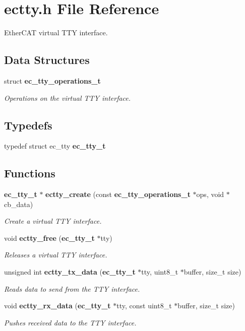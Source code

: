 \section{ectty.\-h \-File \-Reference}
\label{ectty_8h}


\-Ether\-C\-A\-T virtual \-T\-T\-Y interface.  


\subsection*{\-Data \-Structures}
\begin{DoxyCompactItemize}
\item 
struct {\bf ec\-\_\-tty\-\_\-operations\-\_\-t}
\begin{DoxyCompactList}\small\item\em \-Operations on the virtual \-T\-T\-Y interface. \end{DoxyCompactList}\end{DoxyCompactItemize}
\subsection*{\-Typedefs}
\begin{DoxyCompactItemize}
\item 
typedef struct ec\-\_\-tty {\bf ec\-\_\-tty\-\_\-t}
\end{DoxyCompactItemize}
\subsection*{\-Functions}
\begin{DoxyCompactItemize}
\item 
{\bf ec\-\_\-tty\-\_\-t} $\ast$ {\bf ectty\-\_\-create} (const {\bf ec\-\_\-tty\-\_\-operations\-\_\-t} $\ast$ops, void $\ast$cb\-\_\-data)
\begin{DoxyCompactList}\small\item\em \-Create a virtual \-T\-T\-Y interface. \end{DoxyCompactList}\item 
void {\bf ectty\-\_\-free} ({\bf ec\-\_\-tty\-\_\-t} $\ast$tty)
\begin{DoxyCompactList}\small\item\em \-Releases a virtual \-T\-T\-Y interface. \end{DoxyCompactList}\item 
unsigned int {\bf ectty\-\_\-tx\-\_\-data} ({\bf ec\-\_\-tty\-\_\-t} $\ast$tty, uint8\-\_\-t $\ast$buffer, size\-\_\-t size)
\begin{DoxyCompactList}\small\item\em \-Reads data to send from the \-T\-T\-Y interface. \end{DoxyCompactList}\item 
void {\bf ectty\-\_\-rx\-\_\-data} ({\bf ec\-\_\-tty\-\_\-t} $\ast$tty, const uint8\-\_\-t $\ast$buffer, size\-\_\-t size)
\begin{DoxyCompactList}\small\item\em \-Pushes received data to the \-T\-T\-Y interface. \end{DoxyCompactList}\end{DoxyCompactItemize}


